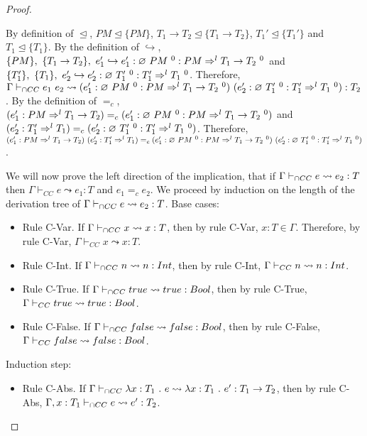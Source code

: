 \documentclass[a4paper]{article}
\begin{document}
\begin{proof}
\begin{itemize}
    By definition of $\trianglelefteq$, $PM \trianglelefteq \{PM\}$, $T_1 \rightarrow T_2 \trianglelefteq \{T_1 \rightarrow T_2\}$, $T_1' \trianglelefteq \{T_1'\}$ and $T_1 \trianglelefteq \{T_1\}$.
    By the definition of $\hookrightarrow$, $\{PM\},\ \{T_1 \rightarrow T_2\},\ e_1' \hookrightarrow e_1' : \varnothing\ PM\ ^{0} : PM \Rightarrow^l T_1 \rightarrow T_2\ ^0$ and $\{T_1'\},\ \{T_1\},\ e_2' \hookrightarrow e_2' : \emptycast{T_1'}{0} : T_1' \Rightarrow^l T_1\ ^0$.
    Therefore, $\Gamma \vdash_{\cap CC} e_1\ e_2 \leadsto (e_1' : \varnothing\ PM\ ^{0} : PM \Rightarrow^l T_1 \rightarrow T_2\ ^0)\ (e_2' : \varnothing\ T_1'\ ^{0} : T_1' \Rightarrow^l T_1\ ^0) : T_2$.
    By the definition of $=_c$, $(e_1' : PM \Rightarrow^l T_1 \rightarrow T_2) =_c (e_1' : \emptycast{PM}{0} : PM \Rightarrow^l T_1 \rightarrow T_2\ ^0)$ and $(e_2' : T_1' \Rightarrow^l T_1) =_c (e_2' : \emptycast{T_1'}{0} : T_1' \Rightarrow^l T_1\ ^0)$.
    Therefore, $(e_1' : PM \Rightarrow^l T_1 \rightarrow T_2)\ (e_2' : T_1' \Rightarrow^l T_1) =_c (e_1' : \emptycast{PM}{0} : PM \Rightarrow^l T_1 \rightarrow T_2\ ^0)\ (e_2' : \emptycast{T_1'}{0} : T_1' \Rightarrow^l T_1\ ^0)$.
\end{itemize}
We will now prove the left direction of the implication, that if $\Gamma \vdash_{\cap CC} e \leadsto e_2 : T$ then $\Gamma \vdash_{CC} e \leadsto e_1 : T$ and $e_1 =_{c} e_2$.
We proceed by induction on the length of the derivation tree of $\Gamma \vdash_{\cap CC} e \leadsto e_2 : T$.
Base cases:
\begin{itemize}
    \item Rule C-Var.
    If $\Gamma \vdash_{\cap CC} x \leadsto x : T$, then by rule C-Var, $x : T \in \Gamma$.
    Therefore, by rule C-Var, $\Gamma \vdash_{CC} x \leadsto x : T$.
    \item Rule C-Int.
    If $\Gamma \vdash_{\cap CC} n \leadsto n : {Int}$, then by rule C-Int, $\Gamma \vdash_{CC} n \leadsto n : {Int}$.
    \item Rule C-True.
    If $\Gamma \vdash_{\cap CC} true \leadsto true : Bool$, then by rule C-True, $\Gamma \vdash_{CC} true \leadsto true : Bool$.
    \item Rule C-False.
    If $\Gamma \vdash_{\cap CC} false \leadsto false : Bool$, then by rule C-False, $\Gamma \vdash_{CC} false \leadsto false : Bool$.
\end{itemize}
Induction step:
\begin{itemize}
    \item Rule C-Abs.
    If $\Gamma \vdash_{\cap CC} \lambda x : T_1\ .\ e \leadsto \lambda x : T_1\ .\ e' : T_1 \rightarrow T_2$, then by rule C-Abs, $\Gamma, x : T_1 \vdash_{\cap CC} e \leadsto e' : T_2$.

\end{itemize}
\end{proof}
\end{document}
